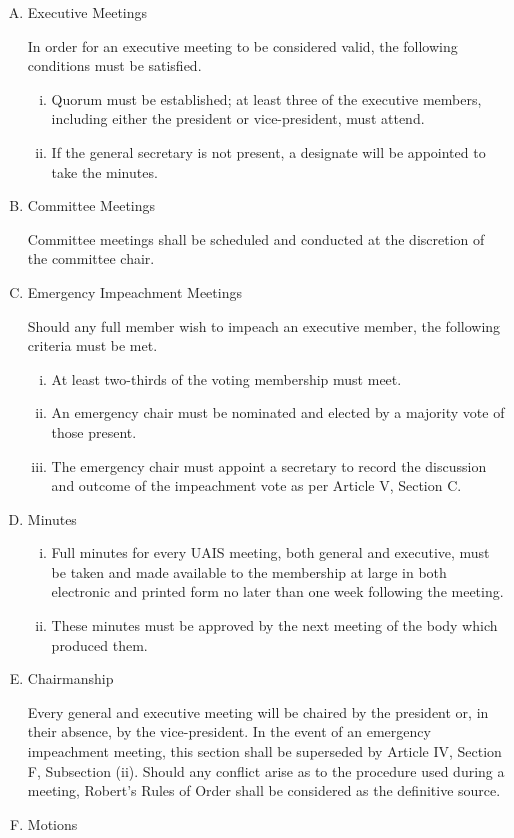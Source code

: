 \documentclass[11pt]{article}
\begin{document}
\begin{enumerate}[I.]
\begin{enumerate}[A)]
      \item Executive Meetings

      In order for an executive meeting to be considered valid, the following
        conditions must be satisfied.
        \begin{enumerate}[i)]
          \item Quorum must be established; at least three of the executive
            members, including either the president or vice-president, must attend.
          \item  If the general secretary is not present, a designate will be appointed to take the minutes.
        \end{enumerate}
      \item Committee Meetings

      Committee meetings shall be scheduled and conducted at the discretion of
        the committee chair.
      \item Emergency Impeachment Meetings

      Should any full member wish to impeach an executive member, the following criteria must be met.
        \begin{enumerate}[i)]
          \item At least two-thirds of the voting membership must meet.
          \item An emergency chair must be nominated and elected by a majority
            vote of those present.
          \item The emergency chair must appoint a secretary to record the
            discussion and outcome of the impeachment vote as per Article V,
            Section C.
        \end{enumerate}
      \item Minutes
        \begin{enumerate}[i)]
          \item Full minutes for every UAIS meeting, both general and executive,
            must be taken and made available to the membership at large in both
            electronic and printed form no later than one week following the
            meeting.
          \item These minutes must be approved by the next meeting of the body
            which produced them.
        \end{enumerate}
      \item Chairmanship

      Every general and executive meeting will be chaired by the president or,
      in their absence, by the vice-president. In the event of an emergency
      impeachment meeting, this section shall be superseded by Article IV,
      Section F, Subsection (ii). Should any conflict arise as to the procedure
      used during a meeting, Robert's Rules of Order shall be considered as the
      definitive source.
      \item Motions


\end{enumerate}
\end{enumerate}
\end{document}
